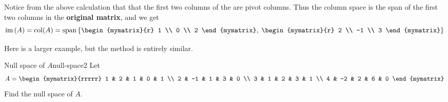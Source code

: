 \begin{solution}
  Notice from the above calculation that that the first two columns of
  the {\rref} are pivot columns. Thus the column space is the span of
  the first two columns in the \textbf{original matrix}, and we get
  \begin{equation*}
    \func{im}\tup{A} = \col(A) =
    \sspan \set{\begin{mymatrix}{r}
        1 \\
        0 \\
        2
      \end{mymatrix}, \; \begin{mymatrix}{r}
        2 \\
        -1 \\
        3
      \end{mymatrix}  }
  \end{equation*}
\end{solution}

Here is a larger example, but the method is entirely similar.

\begin{example}{Null space of $A$}{null-space2}
  Let
  \begin{equation*}
    A=\begin{mymatrix}{rrrrr}
      1 & 2 & 1 & 0 & 1 \\
      2 & -1 & 1 & 3 & 0 \\
      3 & 1 & 2 & 3 & 1 \\
      4 & -2 & 2 & 6 & 0
    \end{mymatrix}
  \end{equation*}
  Find the null space of $A$.
\end{example}

